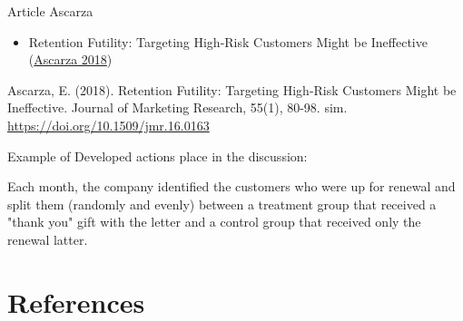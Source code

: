 \documentclass[
  12pt,
]{article}
\newenvironment{Shaded}{\begin{snugshade}}{\end{snugshade}}
\newcommand{\NormalTok}[1]{#1}
\providecommand{\tightlist}{%
  \setlength{\itemsep}{0pt}\setlength{\parskip}{0pt}}
\begin{document}
Article Ascarza

\begin{itemize}
\tightlist
\item
  Retention Futility: Targeting High-Risk Customers Might be Ineffective
  (\protect\hyperlink{ref-ascarza_retention_2018}{Ascarza 2018})
\end{itemize}

Ascarza, E. (2018). Retention Futility: Targeting High-Risk Customers Might be
Ineffective. Journal of Marketing Research, 55(1), 80-98. sim.
\url{https://doi.org/10.1509/jmr.16.0163}

Example of Developed actions place in the discussion:

\begin{Shaded}
\begin{Highlighting}[]
\NormalTok{Each month, the company identified the customers who were up for renewal and}
\NormalTok{split them (randomly and evenly) between a treatment group that received a }
\NormalTok{"thank you" gift with the letter and a control group that received only the }
\NormalTok{renewal latter.}
\end{Highlighting}
\end{Shaded}

\hypertarget{references}{%
\section*{References}\label{references}}
\end{document}
